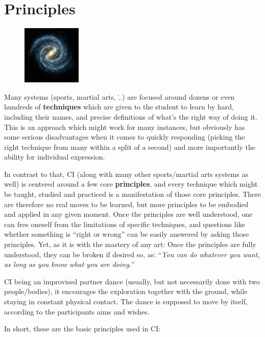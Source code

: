 \section{Principles}\label{sec:principles}

\begin{figure}
\centering
\includegraphics[width=0.25\textwidth]{images/principles}
\end{figure}

Many systems (sports, martial arts, \...) are focused around dozens or even hundreds of \textbf{techniques} which are given to the student to learn by hard, including their names, and precise definitions of what's the right way of doing it.
This is an approach which might work for many instances, but obviously has some serious disadvantages when it comes to quickly responding (picking the right technique from many within a split of a second) and more importantly the ability for individual expression.

In contrast to that, CI (along with many other sports/martial arts systems as well) is centered around a few core \textbf{principles}, and every technique which might be taught, studied and practiced is a manifestation of those core principles.
There are therefore no real moves to be learned, but more principles to be embodied and applied in any given moment.
Once the principles are well understood, one can free oneself from the limitations of specific techniques, and questions like whether something is ``right or wrong'' can be easily answered by asking those principles.
Yet, as it is with the mastery of any art: Once the principles are fully understood, they can be broken if desired so, as: ``\textit{You can do whatever you want, as long as you know what you are doing.}''

CI being an improvised partner dance (usually, but not necessarily done with two people/bodies), it encourages the exploration together with the ground, while staying in constant physical contact.
The dance is supposed to move by itself, according to the participants aims and wishes.

In short, these are the basic principles used in CI:

